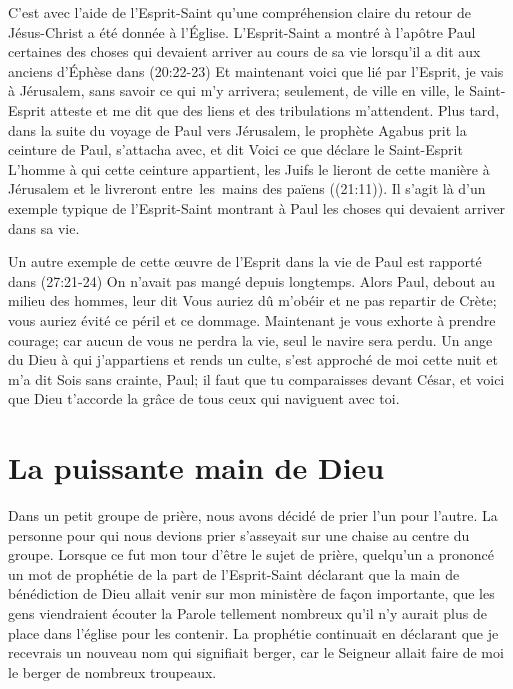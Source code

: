 C'est avec l'aide de l'Esprit-Saint qu'une compréhension claire
 du retour de Jésus-Christ a été donnée à l'Église.
 L'Esprit-Saint a montré à l'apôtre Paul certaines des choses
 qui devaient arriver au cours de sa vie lorsqu'il a dit aux anciens d'Éphèse
 dans (20:22-23)\frcolon{}
 \Og Et maintenant voici que lié par l'Esprit, je vais à Jérusalem,
 sans savoir ce qui m'y arrivera; seulement, de ville en ville,
 le Saint-Esprit atteste et me dit que des liens
 et des tribulations m'attendent. \Fg{}
 Plus tard, dans la suite du voyage de Paul vers Jérusalem,
 le prophète Agabus prit la ceinture de Paul, s'attacha avec, et dit\frcolon{}
 \Og Voici ce que déclare le Saint-Esprit\frcolon{}
 L'homme à qui cette ceinture appartient, les Juifs le lieront
 de cette manière à Jérusalem et le livreront
 entre~les~mains des païens \Fg{} ((21:11)).
 Il s'agit là d'un exemple typique de l'Esprit-Saint montrant à Paul
 les choses qui devaient arriver dans sa vie.

Un autre exemple de cette œuvre de l'Esprit dans la vie de Paul
 est rapporté dans (27:21-24)\frcolon{}
 \Og On n'avait pas mangé depuis longtemps.
 Alors Paul, debout au milieu des hommes, leur dit\frcolon{}
 Vous auriez dû m'obéir et ne pas repartir de Crète;
 vous auriez évité ce péril et ce dommage.
 Maintenant je vous exhorte à prendre courage;
 car aucun de vous ne perdra la vie, seul le navire sera perdu.
 Un ange du Dieu à qui j'appartiens et rends un culte,
 s'est approché de moi cette nuit et m'a dit\frcolon{}
 Sois sans crainte, Paul; il faut que tu comparaisses devant César,
 et voici que Dieu t'accorde la grâce de tous ceux qui naviguent avec toi. \Fg{}


\section{La puissante main de Dieu}

Dans un petit groupe de prière, nous avons décidé de prier
 l'un pour l'autre.
 La personne pour qui nous devions prier s'asseyait sur une chaise
 au centre du groupe. Lorsque ce fut mon tour d'être le sujet de prière,
 quelqu'un a prononcé un mot de prophétie de la part de l'Esprit-Saint
 déclarant que la main de bénédiction de Dieu allait venir
 sur mon ministère de façon importante, que les gens viendraient écouter
 la Parole tellement nombreux qu'il n'y aurait plus de place dans l'église
 pour les contenir.
 La prophétie continuait en déclarant que je recevrais un nouveau nom
 qui signifiait berger, car le Seigneur allait faire de moi le berger
 de nombreux troupeaux.

